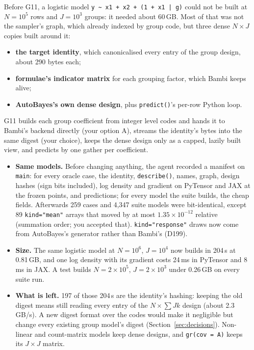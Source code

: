 \documentclass[11pt]{article}
\newcommand{\code}[1]{\texttt{#1}}
\begin{document}
Before G11, a logistic model \code{y \textasciitilde{} x1 + x2 + (1 + x1 | g)} could not be built at $N = 10^5$ rows and
$J = 10^3$ groups: it needed about 60\,GB. Most of that was not the sampler's graph, which already indexed by group code,
but three dense $N \times J$ copies built around it:
\begin{itemize}
\item \textbf{the target identity}, which canonicalised every entry of the group design, about 290 bytes each;
\item \textbf{formulae's indicator matrix} for each grouping factor, which Bambi keeps alive;
\item \textbf{AutoBayes's own dense design}, plus \code{predict()}'s per-row Python loop.
\end{itemize}
G11 builds each group coefficient from integer level codes and hands it to Bambi's backend directly (your option A),
streams the identity's bytes into the same digest (your choice), keeps the dense design only as a capped, lazily built view,
and predicts by one gather per coefficient.
\begin{itemize}
\item \textbf{Same models.} Before changing anything, the agent recorded a manifest on \code{main}: for every oracle case,
  the identity, \code{describe()}, names, graph, design hashes (sign bits included), log density and gradient on PyTensor
  and JAX at the frozen points, and predictions; for every model the suite builds, the cheap fields. Afterwards 259 cases
  and 4{,}347 suite models were bit-identical, except 89 \code{kind="mean"} arrays that moved by at most
  $1.35\times10^{-12}$ relative (summation order; you accepted that). \code{kind="response"} draws now come from AutoBayes's
  generator rather than Bambi's (D199).
\item \textbf{Size.} The same logistic model at $N = 10^6$, $J = 10^4$ now builds in 204\,s at 0.81\,GB, and one log density
  with its gradient costs 24\,ms in PyTensor and 8\,ms in JAX. A test builds $N = 2\times10^5$, $J = 2\times10^3$ under
  0.26\,GB on every suite run.
\item \textbf{What is left.} 197 of those 204\,s are the identity's hashing: keeping the old digest means still reading
  every entry of the $N \times \sum J k$ design (about 2.3\,GB/s). A new digest format over the codes would make it
  negligible but change every existing group model's digest (Section~\ref{sec:decisions}). Non-linear and count-matrix
  models keep dense designs, and \code{gr(cov = A)} keeps its $J \times J$ matrix.
\end{itemize}
\end{document}
